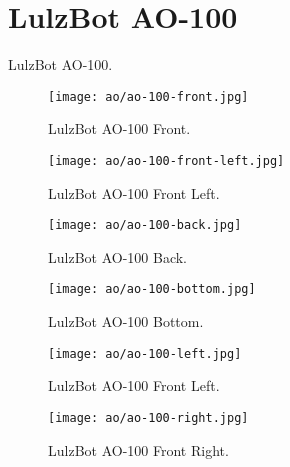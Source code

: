 %
%
%
%
%

\section{LulzBot AO-100}
LulzBot AO-100.

\begin{figure}[h!]
\texttt{[image: ao/ao-100-front.jpg]}
 \caption{LulzBot AO-100 Front.}
 \label{fig:ao-100-1-front}
\end{figure}

\begin{figure}[h!]
\texttt{[image: ao/ao-100-front-left.jpg]}
 \caption{LulzBot AO-100 Front Left.}
 \label{fig:ao-100-1-front-left}
\end{figure}

\begin{figure}[h!]
\texttt{[image: ao/ao-100-back.jpg]}
 \caption{LulzBot AO-100 Back.}
 \label{fig:ao-100-1-back}
\end{figure}

\begin{figure}[h!]
\texttt{[image: ao/ao-100-bottom.jpg]}
 \caption{LulzBot AO-100 Bottom.}
 \label{fig:ao-100-1-bottom}
\end{figure}


\begin{figure}[h!]
\texttt{[image: ao/ao-100-left.jpg]}
 \caption{LulzBot AO-100 Front Left.}
 \label{fig:ao-100-1-left}
\end{figure}

\begin{figure}[h!]
\texttt{[image: ao/ao-100-right.jpg]}
 \caption{LulzBot AO-100 Front Right.}
 \label{fig:ao-100-1-right}
\end{figure}

